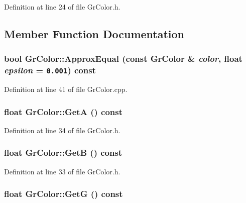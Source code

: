Definition at line 24 of file GrColor.h.

\subsection{Member Function Documentation}
\hypertarget{class_gr_color_d210feeba40d05c520147b15745041f5}{
\subsubsection[{ApproxEqual}]{\setlength{\rightskip}{0pt plus 5cm}bool GrColor::ApproxEqual (const {\bf GrColor} \& {\em color}, \/  float {\em epsilon} = {\tt 0.001}) const}}
\label{class_gr_color_d210feeba40d05c520147b15745041f5}




Definition at line 41 of file GrColor.cpp.\hypertarget{class_gr_color_1d4f646b78299bb6af131fcc14fd1982}{
\subsubsection[{GetA}]{\setlength{\rightskip}{0pt plus 5cm}float GrColor::GetA () const}}
\label{class_gr_color_1d4f646b78299bb6af131fcc14fd1982}




Definition at line 34 of file GrColor.h.\hypertarget{class_gr_color_c273f31227f8cf2a7b70c491dc1fbe91}{
\subsubsection[{GetB}]{\setlength{\rightskip}{0pt plus 5cm}float GrColor::GetB () const}}
\label{class_gr_color_c273f31227f8cf2a7b70c491dc1fbe91}




Definition at line 33 of file GrColor.h.\hypertarget{class_gr_color_0d11096eccfbf065a7262f25d2e29c91}{
\subsubsection[{GetG}]{\setlength{\rightskip}{0pt plus 5cm}float GrColor::GetG () const}}
\label{class_gr_color_0d11096eccfbf065a7262f25d2e29c91}





